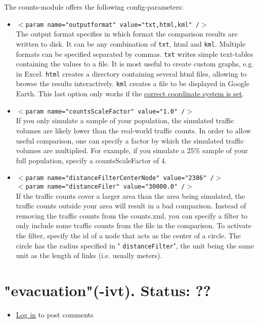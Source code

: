 \documentclass[a4paper,11pt]{report}
\begin{document}
The counts-module offers the following config-parameters:
\begin{itemize}
	\item 
\texttt{$<$param name="outputformat" value="txt,html,kml" /$>$}
\\     The output format specifies in which format the comparison results are written to disk. It can be any combination of 
\texttt{txt}, html and 
\texttt{kml}. Multiple formats can be specified separated by commas. 
\texttt{txt} writes simple text-tables containing the values to a file. It is most useful to create custom graphs, e.g. in Excel. 
\texttt{html} creates a directory containing several html files, allowing to browse the results interactively. 
\texttt{kml} creates a file to be displayed in Google Earth. This last option only works if the \href{http://www.matsim.org/node/405}{correct coordinate system is set}.
	\item 
\texttt{$<$param name="countsScaleFactor" value="1.0" /$>$}
\\     If you only simulate a sample of your population, the simulated  traffic volumes are likely lower than the real-world traffic counts. In  order to allow useful comparison, one can specify a factor by which the  simulated traffic volumes are multiplied. For example, if you simulate a  25\% sample of your full population, specify a countsScaleFactor  of 4.
	\item 
\texttt{$<$param name="distanceFilterCenterNode" value="2386" /$>$
\\     $<$param name="distanceFiler" value="30000.0" /$>$}
\\     If the traffic counts cover a larger area than the area being  simulated, the traffic counts outside your area will result in a bad  comparison. Instead of removing the traffic counts from the counts.xml,  you can specify a filter to only include some traffic counts from the  file in the comparison. To activate the filter, specify the id of a node  that acts as the center of a circle. The circle has the radius  specified in "
\texttt{distanceFilter}", the unit being the same unit as the length of links (i.e. usually meters).
\end{itemize}



\vfill\eject
\section{"evacuation"(-ivt). Status: ??}
\begin{itemize}
	\item \href{http://www.matsim.org/user/login?destination=comment/reply/525%23comment-form}{Log in} to post comments
\end{itemize}
\end{document}
